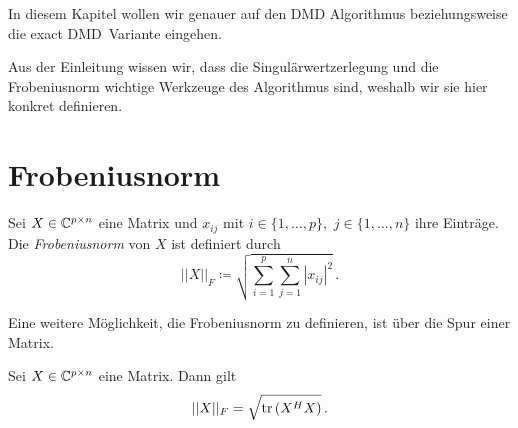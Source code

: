 \documentclass[../Bachelor_LennartKoliwer.tex]{subfiles}
\begin{document}
In diesem Kapitel wollen wir genauer auf den DMD Algorithmus beziehungsweise die \glqq exact DMD\grqq\ Variante eingehen. 

Aus der Einleitung wissen wir, dass die Singulärwertzerlegung und die Frobeniusnorm wichtige Werkzeuge des Algorithmus sind, weshalb wir sie hier konkret definieren.

\section{Frobeniusnorm}\label{chap:Frobeniusnorm}

\begin{definition}[Frobeniusnorm]
	Sei $X\in\mathbb{C}^{p\times n}$ eine Matrix und $x_{ij}$ mit $i\in \{1,\dots,p\},$ $j\in \{1,\dots,n\}$ ihre Einträge. Die \emph{Frobeniusnorm} von $X$ ist definiert durch
	\[
		||X||_F \coloneqq \sqrt{\sum_{i=1}^{p}\sum_{j=1}^{n}|x_{ij}|^2}\,.
	\]
\end{definition}
	Eine weitere Möglichkeit, die Frobeniusnorm zu definieren, ist über die Spur einer Matrix.
\begin{lemma}\label{lem:FrobTrace}
	Sei $X\in\mathbb{C}^{p\times n}$ eine Matrix. Dann gilt
	\[
		||X||_F = \sqrt{\operatorname{tr}\left( X^HX\right)}\,.
	\]
\end{lemma}
\end{document}
